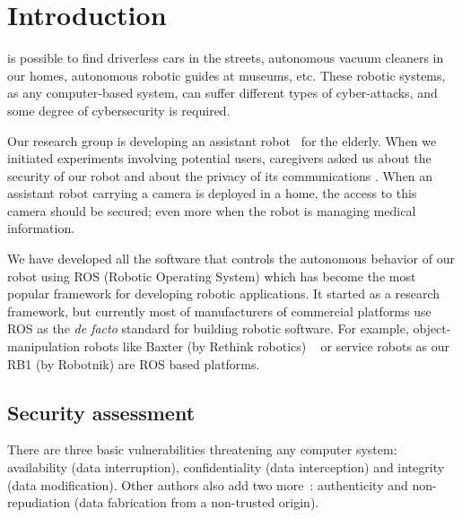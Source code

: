 \documentclass[journal,twoside]{JoPhA}
\begin{document}
\section{Introduction}


 is possible to find driverless cars in the streets, autonomous vacuum cleaners in our homes, autonomous robotic guides at museums, etc. These robotic systems, as any computer-based system, can suffer different types of cyber-attacks, and some degree of cybersecurity \cite{Morante2015} is required. 


Our research group is developing an assistant robot~\cite{Martin2014} for the elderly. When we initiated experiments involving potential users, caregivers asked us about the security of our robot and about the privacy of its communications \cite{Denning2009}. When an assistant robot carrying a camera is deployed in a home, the access to this camera should be secured; even more when the robot is managing medical information. 

We have developed all the software that controls the autonomous behavior of our robot using ROS (Robotic Operating System) \cite{ROS09} which has become the most popular framework for developing robotic applications. It started as a research framework, but currently most of manufacturers of commercial platforms use ROS as the {\em de facto} standard for building robotic software. For example, object-manipulation robots like Baxter (by Rethink robotics) ~\cite{fitzgerald2013developing} or service robots as our RB1 (by Robotnik) are ROS based platforms.





\subsection{Security assessment}


There are three basic vulnerabilities threatening any computer system: availability (data interruption), confidentiality (data interception) and integrity (data modification). Other authors also add two more~\cite{sattarova2007security}: authenticity and non-repudiation (data fabrication from a non-trusted origin). 
\end{document}
